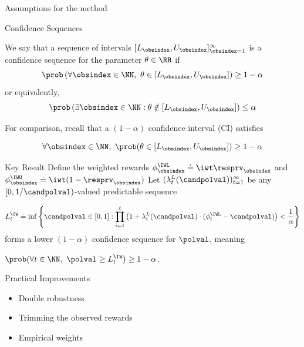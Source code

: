 \documentclass[aspectratio=169, professionalfonts]{beamer}
\begin{document}
\begin{frame}{Assumptions for the method}
\end{frame}

\begin{frame}{Confidence Sequences}
	\begin{definition}
		We say that a sequence of intervals $[L_\obsindex, U_\obsindex]_{\obsindex=1}^\infty$ is a confidence sequence for the parameter $\theta \in \RR$ if
		\begin{equation*}\label{eq:cs}
			\prob \left ( \forall \obsindex \in \NN,\ \theta \in [L_\obsindex, U_\obsindex] \right ) \geq 1-\alpha \end{equation*}
		or equivalently,
		\begin{equation*}
			\prob \left ( \exists \obsindex \in \NN : \theta \notin [L_\obsindex, U_\obsindex] \right ) \leq \alpha
		\end{equation*}
	\end{definition}

	\vfill \pause
	For comparison, recall that a $(1- \alpha)$ confidence interval (CI) satisfies

	$$\forall \obsindex \in \NN,\ \prob(\theta \in [L_\obsindex, U_\obsindex]) \geq 1-\alpha$$
\end{frame}

\begin{frame}{Key Result}
	Define the weighted rewards $\phi_\obsindex^\IWL \doteq \iwt \resprv_\obsindex$ and $\phi_\obsindex^\IWU \doteq
		\iwt(1-\resprv_\obsindex)$
	\vfill
	Let   $(\lambda_t^L(\candpolval))_{t=1}^\infty$ be any $[0, 1/\candpolval)$-valued
	predictable sequence

	\vfill
	\begin{equation}\label{eq:kmr-cs}
		L_t^\IW \doteq \inf\left \{ \candpolval \in [0, 1] : \prod_{i=1}^t \left ( 1 + \lambda_i^L(\candpolval) \cdot (\phi_t^\IWL - \candpolval) \right ) < \frac{1}{\alpha} \right \}
	\end{equation}
	forms a lower $(1-\alpha)$ confidence sequence for $\polval$, meaning

	$\prob(\forall t \in \NN,\ \polval \geq L_t^\IW) \geq 1-\alpha$.
\end{frame}

\begin{frame}{Practical Improvements}
	\begin{itemize}
		\item Double robustness
		\item Trimming the observed rewards
		\item Empirical weights
	\end{itemize}
\end{frame}
\end{document}

